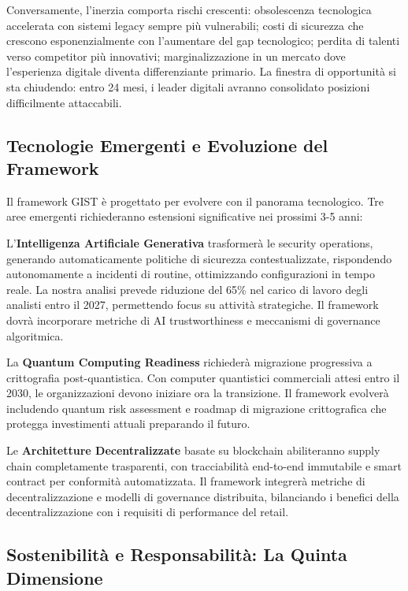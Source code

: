 Conversamente, l'inerzia comporta rischi crescenti: obsolescenza tecnologica accelerata con sistemi legacy sempre più vulnerabili; costi di sicurezza che crescono esponenzialmente con l'aumentare del gap tecnologico; perdita di talenti verso competitor più innovativi; marginalizzazione in un mercato dove l'esperienza digitale diventa differenziante primario. La finestra di opportunità si sta chiudendo: entro 24 mesi, i leader digitali avranno consolidato posizioni difficilmente attaccabili.

\subsection{\texorpdfstring{Tecnologie Emergenti e Evoluzione del Framework}{5.4.2 - Tecnologie Emergenti e Evoluzione del Framework}}
\label{subsec:5.4.2}

Il framework GIST è progettato per evolvere con il panorama tecnologico. Tre aree emergenti richiederanno estensioni significative nei prossimi 3-5 anni:

L'\textbf{Intelligenza Artificiale Generativa} trasformerà le security operations, generando automaticamente politiche di sicurezza contestualizzate, rispondendo autonomamente a incidenti di routine, ottimizzando configurazioni in tempo reale. La nostra analisi prevede riduzione del 65\% nel carico di lavoro degli analisti entro il 2027, permettendo focus su attività strategiche. Il framework dovrà incorporare metriche di AI trustworthiness e meccanismi di governance algoritmica.

La \textbf{Quantum Computing Readiness} richiederà migrazione progressiva a crittografia post-quantistica. Con computer quantistici commerciali attesi entro il 2030, le organizzazioni devono iniziare ora la transizione. Il framework evolverà includendo quantum risk assessment e roadmap di migrazione crittografica che protegga investimenti attuali preparando il futuro.

Le \textbf{Architetture Decentralizzate} basate su blockchain abiliteranno supply chain completamente trasparenti, con tracciabilità end-to-end immutabile e smart contract per conformità automatizzata. Il framework integrerà metriche di decentralizzazione e modelli di governance distribuita, bilanciando i benefici della decentralizzazione con i requisiti di performance del retail.

\subsection{\texorpdfstring{Sostenibilità e Responsabilità: La Quinta Dimensione}{5.4.3 - Sostenibilità e Responsabilità: La Quinta Dimensione}}
\label{subsec:5.4.3}

